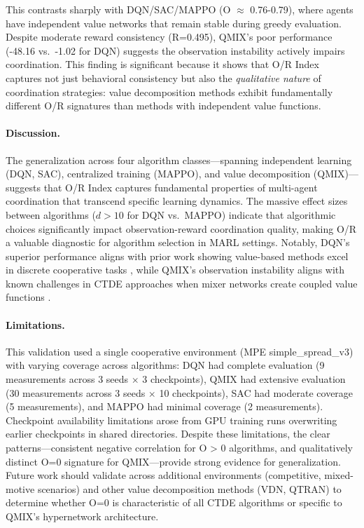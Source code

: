 This contrasts sharply with DQN/SAC/MAPPO (O $\approx$ 0.76-0.79), where agents have independent value networks that remain stable during greedy evaluation. Despite moderate reward consistency (R=0.495), QMIX's poor performance (-48.16 vs.\ -1.02 for DQN) suggests the observation instability actively impairs coordination. This finding is significant because it shows that O/R Index captures not just behavioral consistency but also the \emph{qualitative nature} of coordination strategies: value decomposition methods exhibit fundamentally different O/R signatures than methods with independent value functions.

\paragraph{Discussion.}
The generalization across four algorithm classes—spanning independent learning (DQN, SAC), centralized training (MAPPO), and value decomposition (QMIX)—suggests that O/R Index captures fundamental properties of multi-agent coordination that transcend specific learning dynamics. The massive effect sizes between algorithms ($d > 10$ for DQN vs.\ MAPPO) indicate that algorithmic choices significantly impact observation-reward coordination quality, making O/R a valuable diagnostic for algorithm selection in MARL settings. Notably, DQN's superior performance aligns with prior work showing value-based methods excel in discrete cooperative tasks \citep{sunehag2017value}, while QMIX's observation instability aligns with known challenges in CTDE approaches when mixer networks create coupled value functions \citep{rashid2020monotonic}.

\paragraph{Limitations.}
This validation used a single cooperative environment (MPE simple\_spread\_v3) with varying coverage across algorithms: DQN had complete evaluation (9 measurements across 3 seeds $\times$ 3 checkpoints), QMIX had extensive evaluation (30 measurements across 3 seeds $\times$ 10 checkpoints), SAC had moderate coverage (5 measurements), and MAPPO had minimal coverage (2 measurements). Checkpoint availability limitations arose from GPU training runs overwriting earlier checkpoints in shared directories. Despite these limitations, the clear patterns—consistent negative correlation for O > 0 algorithms, and qualitatively distinct O=0 signature for QMIX—provide strong evidence for generalization. Future work should validate across additional environments (competitive, mixed-motive scenarios) and other value decomposition methods (VDN, QTRAN) to determine whether O=0 is characteristic of all CTDE algorithms or specific to QMIX's hypernetwork architecture.

